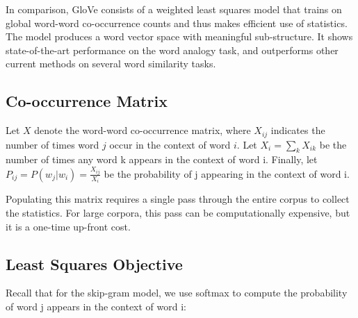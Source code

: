 \documentclass{tufte-handout}
\begin{document}

In comparison, GloVe consists of a weighted least squares model that trains on global word-word co-occurrence counts and thus makes efficient use of statistics. The model produces a word vector space with meaningful sub-structure. It shows state-of-the-art performance on the word analogy task, and outperforms other current methods on several word similarity tasks.

\subsection{Co-occurrence Matrix}


Let $X$ denote the word-word co-occurrence matrix, where $X_{ij}$ indicates the number of times word $j$ occur in the context of word $i$. Let $X_i = \sum_k X_{ik}$ be the number of times any word k appears in the context of word i. Finally, let $P_{ij} = P(w_j | w_i) = \frac{X_{ij}}{X_i}$ be the probability of j appearing in the context of word i.

Populating this matrix requires a single pass through the entire corpus to collect the statistics. For large corpora, this pass can be computationally expensive, but it is a one-time up-front cost.

\subsection{Least Squares Objective}
Recall that for the skip-gram model, we use softmax to compute the probability of word j appears in the context of word i:
\end{document}
